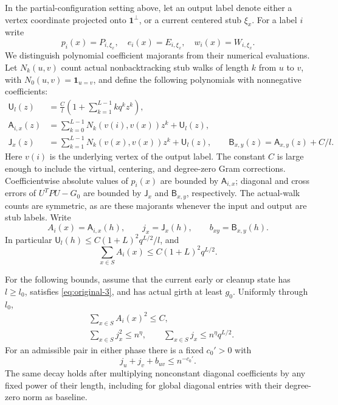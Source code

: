 \begin{lemma}
\label{lemma:path-majorants}
In the partial-configuration setting above, let an output label denote
either a vertex coordinate projected onto $\mathbf1^\perp$, or a current
centered stub $\xi_x$. For a label $i$ write
\[
 p_i(x)=P_{i,\xi_x},\quad e_i(x)=E_{i,\xi_x},\quad
 w_i(x)=W_{i,\xi_x}.
\]
We distinguish polynomial coefficient majorants from their numerical
evaluations. Let $N_k(u,v)$ count actual nonbacktracking stub walks of
length $k$ from $u$ to $v$, with $N_0(u,v)=\mathbf1_{u=v}$, and define
the following polynomials with nonnegative coefficients:
\[
 \begin{aligned}
 \mathsf U_l(z)&=\frac{C}{l}
       \left(1+\sum_{k=1}^{L-1}kq^kz^k\right),\\
 \mathsf A_{i,x}(z)&=\sum_{k=0}^{L-1}N_k(v(i),v(x))z^k
                         +\mathsf U_l(z),\\
 \mathsf J_x(z)&=\sum_{k=1}^{L-1}N_k(v(x),v(x))z^k
                         +\mathsf U_l(z),\qquad
 \mathsf B_{x,y}(z)=\mathsf A_{x,y}(z)+C/l.
 \end{aligned}
\]
Here $v(i)$ is the underlying vertex of the output label. The constant
$C$ is large enough to include the virtual, centering, and degree-zero
Gram corrections. Coefficientwise absolute values of $p_i(x)$ are
bounded by $\mathsf A_{i,x}$; diagonal and cross errors of $U^TPU-G_0$
are bounded by $\mathsf J_x$ and $\mathsf B_{x,y}$, respectively.
The actual-walk counts are symmetric, as are these majorants whenever
the input and output are stub labels. Write
\[
 A_i(x)=\mathsf A_{i,x}(h),\qquad
 j_x=\mathsf J_x(h),\qquad b_{xy}=\mathsf B_{x,y}(h).
\]
In particular $\mathsf U_l(h)\le C(1+L)^2q^{L/2}/l$, and
\begin{equation}
 \sum_{x\in S}A_i(x)\le C(1+L)^2q^{L/2}.
 \label{eq:path-row-sum}
\end{equation}

For the following bounds, assume that the current early or cleanup
state has $l\ge l_0$, satisfies \eqref{eq:original-3}, and has actual
girth at least $g_0$. Uniformly through $l_0$,
\begin{equation}
 \begin{split}
 &\sum_{x\in S}A_i(x)^2\le C,\\
 &\sum_{x\in S}j_x^2\le n^\eta,\qquad
   \sum_{x\in S}j_x\le n^\eta q^{L/2}.
 \end{split}
 \label{eq:original-4}
\end{equation}
For an admissible pair in either phase there is a fixed $c_0'>0$ with
\begin{equation}
 j_u+j_v+b_{uv}\le n^{-c_0'}.
 \label{eq:original-5}
\end{equation}
The same decay holds after multiplying nonconstant diagonal
coefficients by any fixed power of their length, including for global
diagonal entries with their degree-zero norm as baseline.
\end{lemma}

